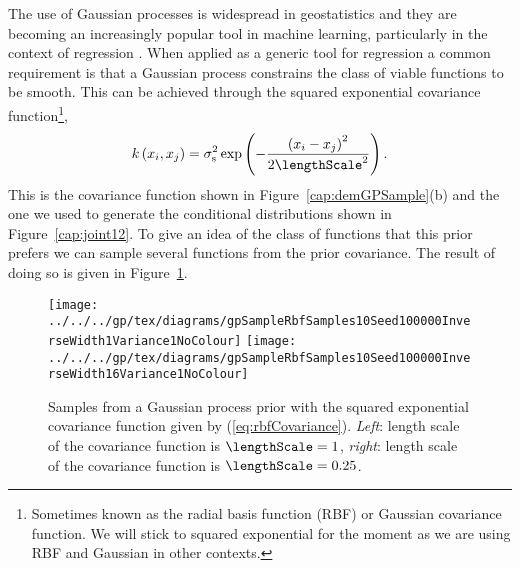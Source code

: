 The use of Gaussian processes is widespread in geostatistics
\citep{Cressie:book93,Stein:interpolation99} and they are becoming an
increasingly popular tool in machine learning, particularly in the
context of regression \citep{Rasmussen:book06}.  When applied as a
generic tool for regression a common requirement is that a Gaussian
process constrains the class of viable functions to be smooth. This
can be achieved through the squared exponential covariance
function\footnote{Sometimes known as the radial basis function (RBF)
  or Gaussian covariance function. We will stick to squared
  exponential for the moment as we are using RBF and Gaussian in other
  contexts.},
\begin{equation}
  k\left(x_{i},x_{j}\right)=\sigma_{\mathrm{s}}^{2}\exp\left(-\frac{\left(x_{i}-x_{j}\right)^{2}}{2\lengthScale^{2}}\right).\label{eq:rbfCovariance}
\end{equation}
This is the covariance function shown in
Figure~\ref{cap:demGPSample}(b) and the one we used to generate the
conditional distributions shown in Figure~\ref{cap:joint12}. To give
an idea of the class of functions that this prior prefers we can
sample several functions from the prior covariance. The result of
doing so is given in Figure~\ref{fig:kernSampleRbfPrior}.
%
\begin{figure}[htb]
  \texttt{[image: ../../../gp/tex/diagrams/gpSampleRbfSamples10Seed100000InverseWidth1Variance1NoColour]}\hfill
  \texttt{[image: ../../../gp/tex/diagrams/gpSampleRbfSamples10Seed100000InverseWidth16Variance1NoColour]}

  \caption{Samples from a Gaussian process prior with the squared
    exponential covariance function given by
    (\ref{eq:rbfCovariance}). \emph{Left}: length scale of the
    covariance function is $\lengthScale=1$, \emph{right}: length
    scale of the covariance function is
    $\lengthScale=0.25$.\label{fig:kernSampleRbfPrior}}

\end{figure}


